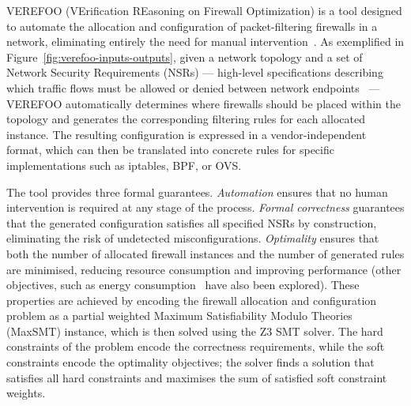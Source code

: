 
VEREFOO (VErification REasoning on Firewall Optimization) is a tool designed to automate the allocation and configuration of packet-filtering firewalls in a network, eliminating entirely the need for manual intervention~\cite{verefoo}. As exemplified in Figure~\ref{fig:verefoo-inputs-outputs}, given a network topology and a set of Network Security Requirements (NSRs) --- high-level specifications describing which traffic flows must be allowed or denied between network endpoints~\cite{twofold} --- VEREFOO automatically determines where firewalls should be placed within the topology and generates the corresponding filtering rules for each allocated instance. The resulting configuration is expressed in a vendor-independent format, which can then be translated into concrete rules for specific implementations such as iptables, BPF, or OVS.

The tool provides three formal guarantees. \textit{Automation} ensures that no human intervention is required at any stage of the process. \textit{Formal correctness} guarantees that the generated configuration satisfies all specified NSRs by construction, eliminating the risk of undetected misconfigurations. \textit{Optimality} ensures that both the number of allocated firewall instances and the number of generated rules are minimised, reducing resource consumption and improving performance (other objectives, such as energy consumption~\cite{greenshield,greenshield-e2c} have also been explored). These properties are achieved by encoding the firewall allocation and configuration problem as a partial weighted Maximum Satisfiability Modulo Theories (MaxSMT) instance, which is then solved using the Z3 SMT solver. The hard constraints of the problem encode the correctness requirements, while the soft constraints encode the optimality objectives; the solver finds a solution that satisfies all hard constraints and maximises the sum of satisfied soft constraint weights.

